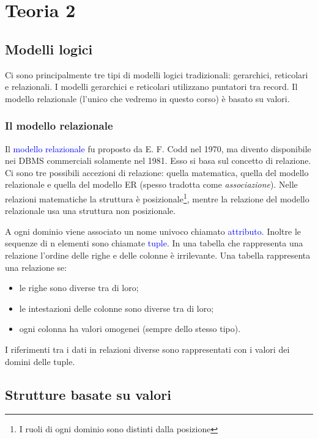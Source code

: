 \chapter{Teoria 2}

\section{Modelli logici}

Ci sono principalmente tre tipi di modelli logici tradizionali: gerarchici, reticolari e relazionali. I modelli gerarchici e reticolari utilizzano puntatori tra record. Il modello relazionale (l'unico che vedremo in questo corso) è basato su valori.

\subsection{Il modello relazionale}

Il \textcolor{blue}{modello relazionale} fu proposto da E. F. Codd nel 1970, ma divento disponibile nei DBMS commerciali solamente nel 1981. Esso si basa sul concetto di relazione. Ci sono tre possibili accezioni di relazione: quella matematica, quella del modello relazionale e quella del modello ER (spesso tradotta come \textit{associazione}). Nelle relazioni matematiche la struttura è posizionale\footnote{I ruoli di ogni dominio sono distinti dalla posizione}, mentre la relazione del modello relazionale usa una struttura non posizionale.

A ogni dominio viene associato un nome univoco chiamato \textcolor{blue}{attributo}. Inoltre le sequenze di n elementi sono chiamate \textcolor{blue}{tuple}.
In una tabella che rappresenta una relazione l'ordine delle righe e delle colonne è irrilevante. Una tabella rappresenta una relazione se:
\begin{itemize}
    \item le righe sono diverse tra di loro;
    \item le intestazioni delle colonne sono diverse tra di loro;
    \item ogni colonna ha valori omogenei (sempre dello stesso tipo). 
\end{itemize}

I riferimenti tra i dati in relazioni diverse sono rappresentati con i valori dei domini delle tuple.

\section{Strutture basate su valori}

